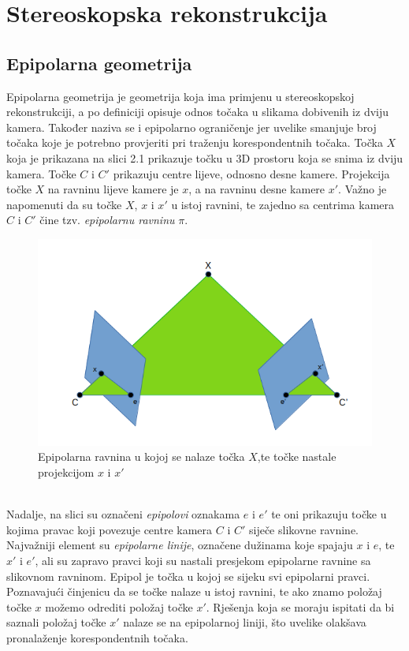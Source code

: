 \documentclass[times, utf8, zavrsni, numeric]{fer}
\begin{document}
\chapter{Stereoskopska rekonstrukcija}
\section{Epipolarna geometrija}
Epipolarna geometrija je geometrija koja ima primjenu u stereoskopskoj rekonstrukciji, a po definiciji opisuje odnos točaka u slikama dobivenih iz dviju kamera. Također naziva se i epipolarno ograničenje jer uvelike smanjuje broj točaka koje je potrebno provjeriti pri traženju korespondentnih točaka. Točka $X$ koja je prikazana na slici 2.1 prikazuje točku u 3D prostoru koja se snima iz dviju kamera. Točke $C$ i $C'$ prikazuju centre lijeve, odnosno desne kamere. Projekcija točke $X$ na ravninu lijeve kamere je $x$, a na ravninu desne kamere $x'$. Važno je napomenuti da su točke $X$, $x$ i $x'$ u istoj ravnini, te zajedno sa centrima kamera $C$ i $C'$ čine tzv. \textit{epipolarnu ravninu} $\pi$.\\
\begin{figure}[htb]
\centering
\includegraphics[scale=0.46]{img/slika1.png}
\caption{Epipolarna ravnina u kojoj se nalaze točka $X$,te točke nastale projekcijom $x$ i $x'$}
\label{fig:Epipolar}
\end{figure}\\
Nadalje, na slici su označeni \textit{epipolovi} oznakama $e$ i $e'$ te oni prikazuju točke u kojima pravac koji povezuje centre kamera $C$ i $C'$ siječe slikovne ravnine.
Najvažniji element su \textit{epipolarne linije}, označene dužinama koje spajaju $x$ i $e$, te $x'$ i $e'$, ali su zapravo pravci koji su nastali presjekom epipolarne ravnine sa slikovnom ravninom. Epipol je točka u kojoj se sijeku svi epipolarni pravci.\\
Poznavajući činjenicu da se točke nalaze u istoj ravnini, te ako znamo položaj točke $x$ možemo odrediti položaj točke $x'$. Rješenja koja se moraju ispitati da bi saznali položaj točke $x'$ nalaze se na epipolarnoj liniji, što uvelike olakšava pronalaženje korespondentnih točaka.
\end{document}
